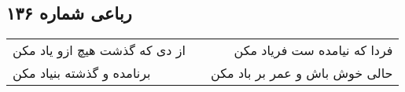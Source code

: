 \begin{center}
\section*{رباعی شماره ۱۳۶}
\label{sec:sh136}
\begin{longtable}{l p{0.5cm} r}
از دی که گذشت هیچ ازو یاد مکن
&&
فردا که نیامده ست فریاد مکن
\\
برنامده و گذشته بنیاد مکن
&&
حالی خوش باش و عمر بر باد مکن
\\
\end{longtable}
\end{center}
